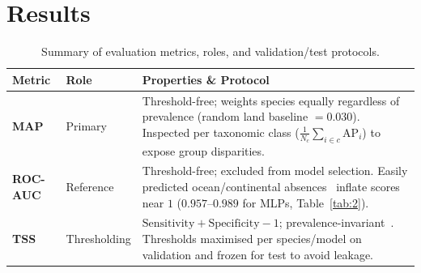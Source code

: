 \documentclass{article}
\begin{document}
\section{Results}\label{eval}

\begin{table}[ht]
    \centering
    \small
    \renewcommand{\arraystretch}{0.88}
    \setlength{\aboverulesep}{1.5pt}
    \setlength{\belowrulesep}{1.5pt}
    \setlength{\tabcolsep}{4pt}
    \begin{tabularx}{\linewidth}{@{} ll >{\raggedright\arraybackslash}X @{}}
        \toprule
        Metric & Role & Properties \& Protocol \\
        \midrule
        \textbf{MAP} & Primary &
        Threshold-free; weights species equally regardless of prevalence (random land baseline $= 0.030$). Inspected per taxonomic class ($\tfrac{1}{N_c}\sum_{i \in c} \text{AP}_i$) to expose group disparities. \\
        \addlinespace[2pt]
        \textbf{ROC-AUC} & Reference &
        Threshold-free; excluded from model selection. Easily predicted ocean/continental absences~\cite{11345587} inflate scores near $1$ ($0.957\text{--}0.989$ for MLPs, Table~\ref{tab:2}). \\
        \addlinespace[2pt]
        \textbf{TSS} & Thresholding &
        $\text{Sensitivity} + \text{Specificity} - 1$; prevalence-invariant~\cite{allouche2006tss}. Thresholds maximised per species/model on validation and frozen for test to avoid leakage. \\
        \bottomrule
    \end{tabularx}
    \caption{Summary of evaluation metrics, roles, and validation/test protocols.}
    \label{tab:eval_metrics}
\end{table}
\end{document}

